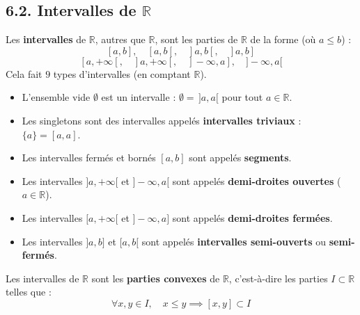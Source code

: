 \documentclass[a4paper,11pt]{article}
\newcommand{\R}{\mathbb{R}}
\newcommand{\mot}[1]{\textcolor{bordeaux}{\textbf{#1}}}
\begin{document}
\newpage
\subsection{6.2. Intervalles de $\R$}

Les \mot{intervalles} de $\R$, autres que $\R$, sont les parties de $\R$ de la forme (où $a \le b$) :
\[
[a, b], \quad [a, b[, \quad ]a, b[, \quad ]a, b]
\]
\[
[a, +\infty[, \quad ]a, +\infty[, \quad ]-\infty, a], \quad ]-\infty, a[
\]
Cela fait $9$ types d'intervalles (en comptant $\R$).

\begin{remarque}
\begin{itemize}
    \item L'ensemble vide $\emptyset$ est un intervalle : $\emptyset = \, ]a, a[$ pour tout $a \in \R$.
    \item Les singletons sont des intervalles appelés \mot{intervalles triviaux} : $\{a\} = [a, a]$.
    \item Les intervalles fermés et bornés $[a, b]$ sont appelés \mot{segments}.
    \item Les intervalles $]a, +\infty[$ et $]-\infty, a[$ sont appelés \mot{demi-droites ouvertes} ($a \in \R$).
    \item Les intervalles $[a, +\infty[$ et $]-\infty, a]$ sont appelés \mot{demi-droites fermées}.
    \item Les intervalles $]a, b]$ et $[a, b[$ sont appelés \mot{intervalles semi-ouverts} ou \mot{semi-fermés}.
\end{itemize}
\end{remarque}

\begin{theoreme}
Les intervalles de $\R$ sont les \mot{parties convexes} de $\R$, c'est-à-dire les parties $I \subset \R$ telles que :
\[
\forall x, y \in I, \quad x \le y \implies [x, y] \subset I
\]
\end{theoreme}
\end{document}
